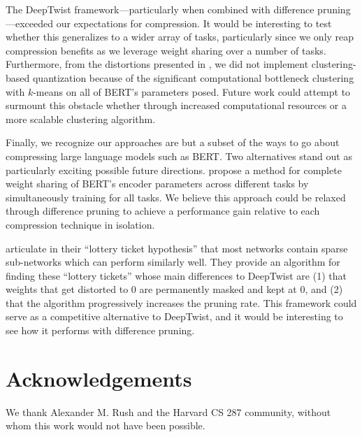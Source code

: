 \documentclass[10pt]{article}
\begin{document}
The DeepTwist framework---particularly when combined with difference
pruning---exceeded our expectations for compression. It would be interesting to
test whether this generalizes to a wider array of tasks, particularly since we
only reap compression benefits as we leverage weight sharing over a number of
tasks. Furthermore, from the distortions presented in \citet{lee2018deeptwist},
we did not implement clustering-based quantization because of the significant
computational bottleneck clustering with $k$-means on all of BERT's parameters
posed. Future work could attempt to surmount this obstacle whether through
increased computational resources or a more scalable clustering algorithm.

Finally, we recognize our approaches are but a subset of the ways to go about
compressing large language models such as BERT. Two alternatives stand out as
particularly exciting possible future directions. \citet{liu2019multi} propose a
method for complete weight sharing of BERT's encoder parameters across different
tasks by simultaneously training for all tasks. We believe this approach could
be relaxed through difference pruning to achieve a performance gain relative to
each compression technique in isolation. 

\citet{frankle2018lottery} articulate in their ``lottery ticket hypothesis''
that most networks contain sparse sub-networks which can perform similarly well.
They provide an algorithm for finding these ``lottery tickets'' whose main
differences to DeepTwist are (1) that weights that get distorted to 0 are
permanently masked and kept at 0, and (2) that the algorithm progressively
increases the pruning rate. This framework could serve as a competitive
alternative to DeepTwist, and it would be interesting to see how it performs
with difference pruning.

\section*{Acknowledgements}

We thank Alexander M. Rush and the Harvard CS 287 community, without whom
this work would not have been possible.



\end{document}
